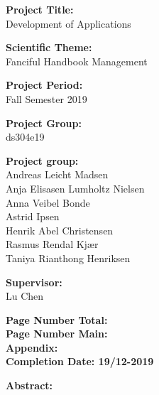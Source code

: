 \begin{minipage}[t]{0.48\textwidth}
\textbf{Project Title:} \\[5pt]\hspace*{2ex}
Development of Applications

\textbf{Scientific Theme:} \\[5pt]\hspace{2ex}
Fanciful Handbook Management

\textbf{Project Period:} \\[5pt]\bigskip\hspace{2ex}
Fall Semester 2019

\textbf{Project Group:} \\[5pt]\bigskip\hspace{2ex}
ds304e19

\textbf{Project group:} \\[5pt]\hspace*{2ex}
Andreas Leicht Madsen \\\hspace*{2ex}
Anja Elisasen Lumholtz Nielsen \\\hspace*{2ex}
Anna Veibel Bonde \\\hspace*{2ex}
Astrid Ipsen \\\hspace*{2ex}
Henrik Abel Christensen \\\hspace*{2ex}
Rasmus Rendal Kjær \\\hspace*{2ex}
Taniya Rianthong Henriksen \\\hspace*{2ex}

\textbf{Supervisor:} \\[5pt]\hspace*{2ex}
Lu Chen \\\hspace*{2ex}

\vspace*{1cm}

\textbf{Page Number Total: \color{red}{???}}\\
\textbf{Page Number Main: \pageref{LastPage} }\\
\textbf{Appendix: \color{red}{???}} \\ 
\textbf{Completion Date: 19/12-2019}

\end{minipage}
\hfill
\begin{minipage}[t]{0.483\textwidth}
\textbf{Abstract:} \\[5pt]
\fbox{\parbox{8cm}{\bigskip\bigskip}}
\end{minipage}

